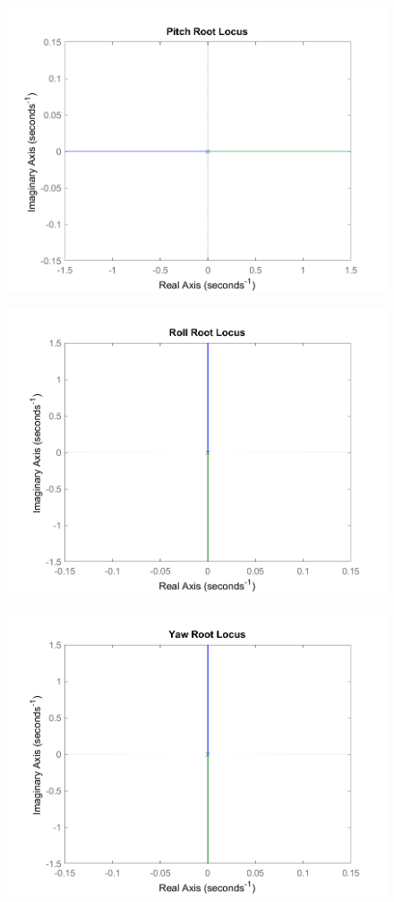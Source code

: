 \documentclass[12pt]{article}
\begin{document}
\begin{figure}[h]
\includegraphics[width=0.75\linewidth]{images/Pitch_rootlocus.png}
\centering
\end{figure}

\begin{figure}[h]
\includegraphics[width=0.75\linewidth]{images/Roll_rootlocus.png}
\centering
\end{figure}

\begin{figure}[h]
\includegraphics[width=0.75\linewidth]{images/Yaw_rootlocus.png}
\centering
\end{figure}
\end{document}

